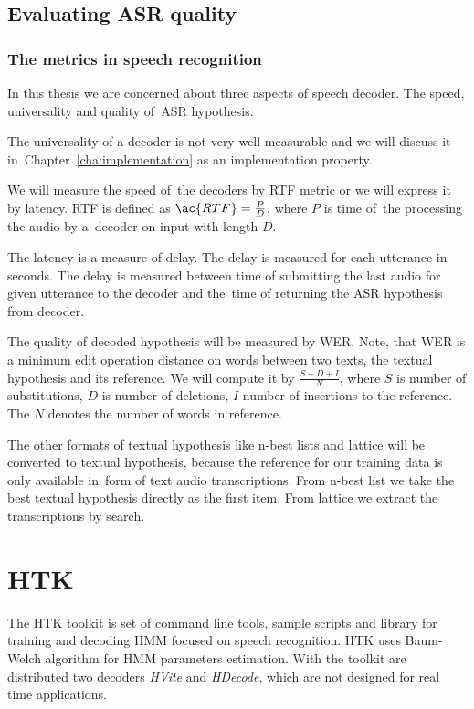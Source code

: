 {\subsection{Evaluating \ac{ASR} quality}
\label{sub:eval}

\subsubsection*{The metrics in speech recognition}
\label{sub:the_metrics_in_speech_recognition}
In this thesis we are concerned about three aspects of speech decoder.
The speed, universality and quality of~\ac{ASR} hypothesis.

The universality of a decoder is not very well measurable and we will discuss it 
in~Chapter~\ref{cha:implementation} as an implementation property.

We will measure the speed of~the decoders by \acl{RTF} metric or we will express it by latency.
\ac{RTF} is defined as $\ac{RTF} = \frac{P}{D}$, where $P$ is time of~the processing the audio by a~decoder on input with length $D$. 

The latency is a measure of delay. The delay is measured for each utterance in seconds. 
The delay is measured between time of submitting the last audio for given utterance to the decoder and 
the~time of returning the \ac{ASR} hypothesis from decoder.

The quality of decoded hypothesis will be measured by \ac{WER}.
Note, that \ac{WER} is a minimum edit operation distance on words between two texts, the textual hypothesis
and its reference.
We will compute it by $\frac{S+D+I}{N}$, where $S$ is number of substitutions,
$D$ is number of deletions, $I$ number of insertions to the reference. 
The $N$ denotes the number of words in reference.

The other formats of textual hypothesis like n-best lists and lattice
will be converted to textual hypothesis, because the reference for our training data is only available  
in~form of text audio transcriptions.
From n-best list we take the best textual hypothesis directly as the first item. From lattice
we extract the transcriptions by search.  



\section{\ac{HTK}}
\label{sec:back_htk}
The \ac{HTK} toolkit is set of command line tools, sample scripts and library
for training and decoding \ac{HMM} focused on speech recognition.
\ac{HTK} uses Baum-Welch algorithm for \ac{HMM} parameters estimation.
With the toolkit are distributed two decoders {\it HVite} and {\it HDecode},
which are not designed for real time applications.

}
